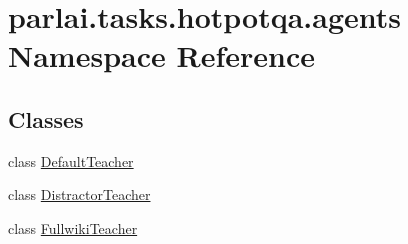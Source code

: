 \hypertarget{namespaceparlai_1_1tasks_1_1hotpotqa_1_1agents}{}\section{parlai.\+tasks.\+hotpotqa.\+agents Namespace Reference}
\label{namespaceparlai_1_1tasks_1_1hotpotqa_1_1agents}
\subsection*{Classes}
\begin{DoxyCompactItemize}
\item 
class \hyperlink{classparlai_1_1tasks_1_1hotpotqa_1_1agents_1_1DefaultTeacher}{Default\+Teacher}
\item 
class \hyperlink{classparlai_1_1tasks_1_1hotpotqa_1_1agents_1_1DistractorTeacher}{Distractor\+Teacher}
\item 
class \hyperlink{classparlai_1_1tasks_1_1hotpotqa_1_1agents_1_1FullwikiTeacher}{Fullwiki\+Teacher}
\end{DoxyCompactItemize}
